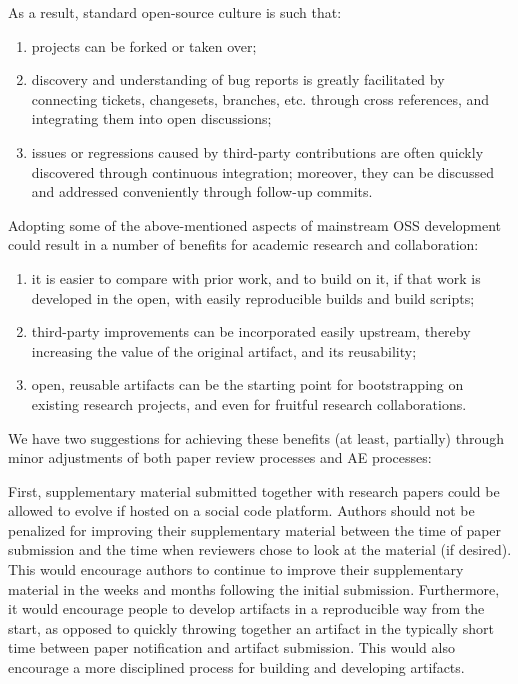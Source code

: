 \documentclass{sigplanconf}
\begin{document}
As a result, standard open-source culture is such that:

\begin{enumerate}

\item projects can be forked or taken over;

\item discovery and understanding of bug reports is greatly facilitated by
connecting tickets, changesets, branches, etc. through cross references, and
integrating them into open discussions;

\item issues or regressions caused by third-party contributions are often
quickly discovered through continuous integration; moreover, they can be
discussed and addressed conveniently through follow-up commits.

\end{enumerate}

Adopting some of the above-mentioned aspects of mainstream OSS development
could result in a number of benefits for academic research and collaboration:

\begin{enumerate}

\item it is easier to compare with prior work, and to build on it, if that work is
developed in the open, with easily reproducible builds and build scripts;

\item third-party improvements can be incorporated easily upstream, thereby
increasing the value of the original artifact, and its reusability;

\item open, reusable artifacts can be the starting point for bootstrapping on
existing research projects, and even for fruitful research collaborations.

\end{enumerate}

We have two suggestions for achieving these benefits (at least, partially)
through minor adjustments of both paper review processes and AE processes:

First, supplementary material submitted together with research papers could be
allowed to evolve if hosted on a social code platform. Authors should not be
penalized for improving their supplementary material between the time of paper
submission and the time when reviewers chose to look at the material (if
desired). This would encourage authors to continue to improve their
supplementary material in the weeks and months following the initial
submission. Furthermore, it would encourage people to develop artifacts in a
reproducible way from the start, as opposed to quickly throwing together an
artifact in the typically short time between paper notification and artifact
submission. This would also encourage a more disciplined process for building
and developing artifacts.
\end{document}
